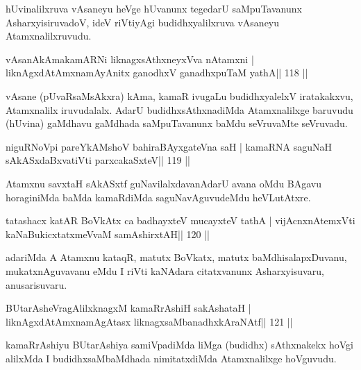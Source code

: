 \begin{artha}
hUvinalilxruva vAsaneyu heVge hUvanunx tegedarU saMpuTavanunx  AsharxyisiruvadoV, ideV riVtiyAgi budidhxyalilxruva vAsaneyu Atamxnalilxruvudu.
\end{artha}

\begin{shl}
vAsanAkAmakamARNi liknagxsAthxneyxVva nA\s\s tamxni |
liknAgxdAtAmxnamAyAnitx ganodhxV ganadhxpuTaM yathA\hfill || 118 ||
\end{shl}

\begin{artha}
vAsane (pUvaRsaMsAkxra) kAma, kamaR ivugaLu budidhxyalelxV iratakakxvu, Atamxnalilx iruvudalalx. AdarU budidhxsAthxnadiMda Atamxnalilxge baruvudu (hUvina) gaMdhavu gaMdhada saMpuTavanunx baMdu seVruvaMte seVruvadu.
\end{artha}


\begin{shl}
niguRNoV\s pi pareYkAMshoV bahiraBAyxgateVna saH |
kamaRNA saguNaH sAkASxdaBxvatiVti parxcakaSxteV\hfill || 119 ||
\end{shl}

\begin{artha}
Atamxnu savxtaH sAkASxtf guNavilalxdavanAdarU avana oMdu BAgavu
horaginiMda baMda kamaRdiMda saguNavAguvudeMdu heVLutAtxre.
\end{artha}

\begin{shl}
tatashacx katAR BoVkAtx ca badhayxteV mucayxteV tathA |
vijAcnxnAtemxVti kaNaBukicxtatxmeVvaM samAshirxtAH\hfill || 120 ||
\end{shl}

\begin{artha}
adariMda A Atamxnu kataqR, matutx BoVkatx, matutx baMdhisalapxDuvanu, mukatxnAguvavanu eMdu I riVti kaNAdara citatxvanunx Asharxyisuvaru, anusarisuvaru.
\end{artha}

\begin{shl}
BUtarAsheVragAlilxknagxM kamaRrAshiH sakAshataH |
liknAgxdAtAmxnamAgAtasx liknagxsaMbanadhxkAraNAtf\hfill || 121 ||
\end{shl}

\begin{artha}
kamaRrAshiyu BUtarAshiya samiVpadiMda liMga (budidhx) sAthxnakekx hoVgi
alilxMda I budidhxsaMbaMdhada nimitatxdiMda Atamxnalilxge hoVguvudu.
\end{artha}

